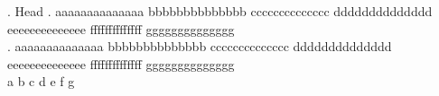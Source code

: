 

\ex. Head
\ag. aaaaaaaaaaaaaa bbbbbbbbbbbbbb cccccccccccccc dddddddddddddd eeeeeeeeeeeeee ffffffffffffff gggggggggggggg\\
\bg. aaaaaaaaaaaaaa bbbbbbbbbbbbbb cccccccccccccc dddddddddddddd eeeeeeeeeeeeee ffffffffffffff gggggggggggggg\\
\CommonGloss a b c d e f g\\


